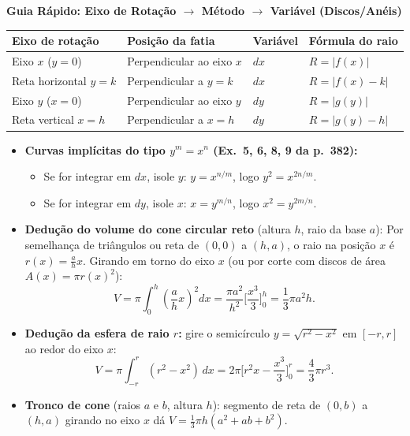 \documentclass[10pt,a4paper]{article}
\begin{document}
\begin{center}
\textbf{Guia Rápido: Eixo de Rotação $\longrightarrow$ Método $\longrightarrow$ Variável (Discos/Anéis)} \\[3pt]
\begin{tabular}{llll}
\toprule
Eixo de rotação & Posição da fatia & Variável & Fórmula do raio \\
\midrule
Eixo $x$ ($y=0$) & Perpendicular ao eixo $x$ & $dx$ & $R = |f(x)|$ \\
Reta horizontal $y=k$ & Perpendicular a $y=k$ & $dx$ & $R = |f(x) - k|$ \\
Eixo $y$ ($x=0$) & Perpendicular ao eixo $y$ & $dy$ & $R = |g(y)|$ \\
Reta vertical $x=h$ & Perpendicular a $x=h$ & $dy$ & $R = |g(y) - h|$ \\
\bottomrule
\end{tabular}
\end{center}

\begin{dica}
    \begin{itemize}
        \item \textbf{Curvas implícitas do tipo $y^m = x^n$ (Ex.\ 5, 6, 8, 9 da p.\ 382):}
              \begin{itemize}
                  \item Se for integrar em $dx$, isole $y$: $\displaystyle y = x^{n/m}$, logo $y^2 = x^{2n/m}$.
                  \item Se for integrar em $dy$, isole $x$: $\displaystyle x = y^{m/n}$, logo $x^2 = y^{2m/n}$.
              \end{itemize}
        \item \textbf{Dedução do volume do cone circular reto} (altura $h$, raio da base $a$):
              Por semelhança de triângulos ou reta de $(0,0)$ a $(h,a)$, o raio na posição $x$ é $\displaystyle r(x) = \frac{a}{h}x$. Girando em torno do eixo $x$ (ou por corte com discos de área $A(x)=\pi r(x)^2$):
              \[
                  V = \pi \int_{0}^{h} \left(\frac{a}{h}x\right)^2 dx = \frac{\pi a^2}{h^2} \Big[ \frac{x^3}{3} \Big]_{0}^{h} = \frac{1}{3}\pi a^2 h.
              \]
        \item \textbf{Dedução da esfera de raio $r$:} gire o semicírculo $y = \sqrt{r^2 - x^2}$ em $[-r,r]$ ao redor do eixo $x$:
              \[
                  V = \pi \int_{-r}^{r} (r^2 - x^2)\,dx = 2\pi \Big[ r^2 x - \frac{x^3}{3} \Big]_{0}^{r} = \frac{4}{3}\pi r^3.
              \]
        \item \textbf{Tronco de cone} (raios $a$ e $b$, altura $h$): segmento de reta de $(0,b)$ a $(h,a)$ girando no eixo $x$ dá $\displaystyle V = \frac{1}{3}\pi h (a^2 + ab + b^2)$.
    \end{itemize}
\end{dica}
\end{document}
